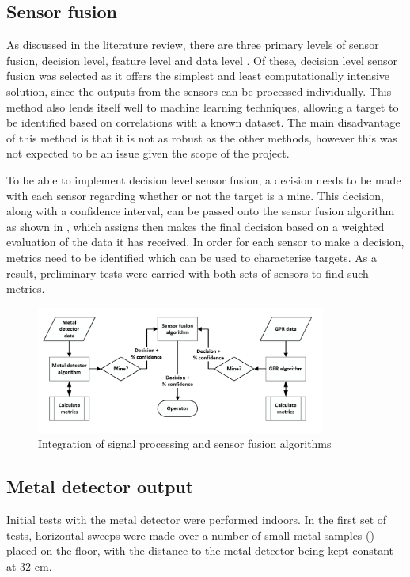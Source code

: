 \documentclass[main.tex]{subfiles}
\begin{document}
\subsection{Sensor fusion}
As discussed in the literature review, there are three primary levels of sensor fusion, decision level, feature level and data level \parencite{Yarovoy2009}. Of these, decision level sensor fusion was selected as it offers the simplest and least computationally intensive solution, since the outputs from the sensors can be processed individually. This method also lends itself well to machine learning techniques, allowing a target to be identified based on correlations with a known dataset. The main disadvantage of this method is that it is not as robust as the other methods, however this was not expected to be an issue given the scope of the project. 

To be able to implement decision level sensor fusion, a decision needs to be made with each sensor regarding whether or not the target is a mine. This decision, along with a confidence interval, can be passed onto the sensor fusion algorithm as shown in , which assigns then makes the final decision based on a weighted evaluation of the data it has received. In order for each sensor to make a decision, metrics need to be identified which can be used to characterise targets. As a result, preliminary tests were carried with both sets of sensors to find such metrics.

\begin{figure}[ht]
\includegraphics[width=0.85\textwidth]{3-ConceptDesign/fusion.PNG}
\centering
\caption{Integration of signal processing and sensor fusion algorithms} 
\end{figure}

\subsection{Metal detector output}
Initial tests with the metal detector were performed indoors. In the first set of tests, horizontal sweeps were made over a number of small metal samples () placed on the floor, with the distance to the metal detector being kept constant at 32 cm. 
\end{document}

